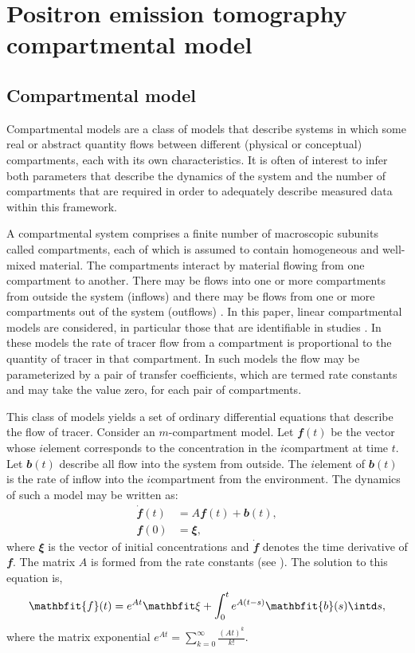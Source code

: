 \chapter{Positron emission tomography compartmental model}
\label{cha:Positron emission tomography compartmental model}

\section{Compartmental model}
\label{sec:Compartmental model}

Compartmental models are a class of models that describe systems in which some
real or abstract quantity flows between different (physical or conceptual)
compartments, each with its own characteristics. It is often of interest to
infer both parameters that describe the dynamics of the system and the number
of compartments that are required in order to adequately describe measured
data within this framework.

A compartmental system comprises a finite number of macroscopic subunits
called compartments, each of which is assumed to contain homogeneous and
well-mixed material. The compartments interact by material flowing from one
compartment to another. There may be flows into one or more compartments from
outside the system (inflows) and there may be flows from one or more
compartments out of the system (outflows) \cite{Jacquez:1996gc}. In this
paper, linear compartmental models are considered, in particular those that
are identifiable in \pet studies \cite{Schmidt99}. In these models the rate
of tracer flow from a compartment is proportional to the quantity of tracer in
that compartment. In such models the flow may be parameterized by a pair of
transfer coefficients, which are termed rate constants and may take the value
zero, for each pair of compartments.

This class of models yields a set of ordinary differential equations that
describe the flow of tracer. Consider an $m$-compartment model. Let
$\mathbfit{f}(t)$ be the vector whose $i$\xth element corresponds to the
concentration in the $i$\xth compartment at time $t$. Let $\mathbfit{b}(t)$ describe
all flow into the system from outside. The $i$\xth element of $\mathbfit{b}(t)$ is
the rate of inflow into the $i$\xth compartment from the environment. The
dynamics of such a model may be written as:
\begin{align*}
  \dot{\mathbfit{f}}(t) &= A\mathbfit{f}(t) + \mathbfit{b}(t), \\
  \mathbfit{f}(0) &= \mathbfit\xi,
\end{align*}
where $\mathbfit\xi$ is the vector of initial concentrations and
$\dot{\mathbfit{f}}$
denotes the time derivative of $\mathbfit{f}$. The matrix $A$ is formed from
the rate constants (see \cite{Gunn:2001cx}).  The solution to this equation
is,
\begin{equation*}
  \mathbfit{f}(t) = e^{A t}\mathbfit\xi + \int_0^t e^{A(t-s)}\mathbfit{b}(s)\intd s,
\end{equation*}
where the matrix exponential $e^{A t} = \sum_{k = 0}^{\infty}
\frac{(A t)^k}{k!}$.

